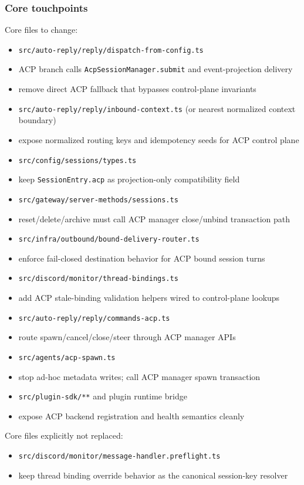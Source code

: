 \subsubsection{Core touchpoints}


Core files to change:

\begin{itemize}
  \item \texttt{src/auto-reply/reply/dispatch-from-config.ts}
  \item ACP branch calls \texttt{AcpSessionManager.submit} and event-projection delivery
  \item remove direct ACP fallback that bypasses control-plane invariants
  \item \texttt{src/auto-reply/reply/inbound-context.ts} (or nearest normalized context boundary)
  \item expose normalized routing keys and idempotency seeds for ACP control plane
  \item \texttt{src/config/sessions/types.ts}
  \item keep \texttt{SessionEntry.acp} as projection-only compatibility field
  \item \texttt{src/gateway/server-methods/sessions.ts}
  \item reset/delete/archive must call ACP manager close/unbind transaction path
  \item \texttt{src/infra/outbound/bound-delivery-router.ts}
  \item enforce fail-closed destination behavior for ACP bound session turns
  \item \texttt{src/discord/monitor/thread-bindings.ts}
  \item add ACP stale-binding validation helpers wired to control-plane lookups
  \item \texttt{src/auto-reply/reply/commands-acp.ts}
  \item route spawn/cancel/close/steer through ACP manager APIs
  \item \texttt{src/agents/acp-spawn.ts}
  \item stop ad-hoc metadata writes; call ACP manager spawn transaction
  \item \texttt{src/plugin-sdk/**} and plugin runtime bridge
  \item expose ACP backend registration and health semantics cleanly
\end{itemize}


Core files explicitly not replaced:

\begin{itemize}
  \item \texttt{src/discord/monitor/message-handler.preflight.ts}
  \item keep thread binding override behavior as the canonical session-key resolver
\end{itemize}


